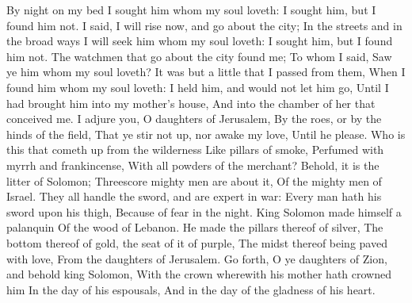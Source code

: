 By night on my bed I sought him whom my soul loveth: I sought him, but I found him not.  I said, I will rise now, and go about the city; In the streets and in the broad ways I will seek him whom my soul loveth: I sought him, but I found him not.  The watchmen that go about the city found me; To whom I said, Saw ye him whom my soul loveth?  It was but a little that I passed from them, When I found him whom my soul loveth: I held him, and would not let him go, Until I had brought him into my mother’s house, And into the chamber of her that conceived me.  I adjure you, O daughters of Jerusalem, By the roes, or by the hinds of the field, That ye stir not up, nor awake my love, Until he please.  Who is this that cometh up from the wilderness Like pillars of smoke, Perfumed with myrrh and frankincense, With all powders of the merchant?  Behold, it is the litter of Solomon; Threescore mighty men are about it, Of the mighty men of Israel.  They all handle the sword, and are expert in war: Every man hath his sword upon his thigh, Because of fear in the night.  King Solomon made himself a palanquin Of the wood of Lebanon.  He made the pillars thereof of silver, The bottom thereof of gold, the seat of it of purple, The midst thereof being paved with love, From the daughters of Jerusalem.  Go forth, O ye daughters of Zion, and behold king Solomon, With the crown wherewith his mother hath crowned him In the day of his espousals, And in the day of the gladness of his heart. 

